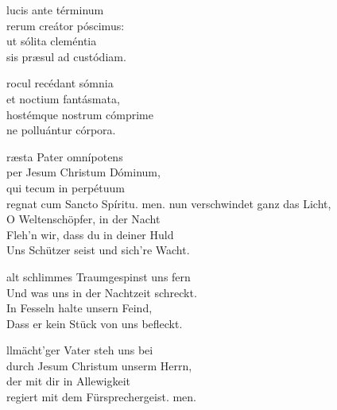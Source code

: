 \documentclass[fontsize=10pt,paper=A5,twoside,BCOR=1mm,DIV=21,headinclude]{scrarticle}
\begin{document}

\vspace{.3em}

\begin{paracol}{2}\pcb
\begin{hymnus}
 lucis ante términum\\
\hspace{1.6em} rerum creátor póscimus:\\
ut sólita cleméntia\\
sis præsul ad custódiam.

rocul recédant sómnia\\
et noctium fantásmata,\\
hostémque nostrum cómprime\\
ne polluántur córpora.

ræsta Pater omnípotens\\
per Jesum Christum Dóminum,\\
qui tecum in perpétuum\\
regnat cum Sancto Spíritu. men.
	\switchcolumn
	 nun verschwindet ganz das Licht,\\
	\hspace{1.6em} O Weltenschöpfer, in der Nacht\\
	Fleh'n wir, dass du in deiner Huld\\
	Uns Schützer seist und sich're Wacht.

	alt schlimmes Traumgespinst uns fern\\
	Und was uns in der Nachtzeit schreckt.\\
	In Fesseln halte unsern Feind,\\
	Dass er kein Stück von uns befleckt.

	llmächt'ger Vater steh uns bei\\
	durch Jesum Christum unserm Herrn,\\
	der mit dir in Allewigkeit\\
	regiert mit dem Fürsprechergeist. men.
\end{hymnus}
\end{paracol}


\vspace{.3em}
\end{document}
